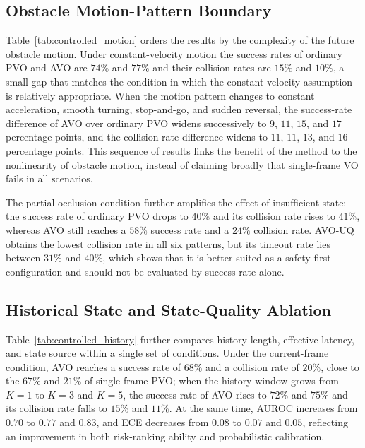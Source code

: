 \documentclass[10pt,a4paper,twocolumn]{article}
\begin{document}
\subsection{Obstacle Motion-Pattern Boundary}

Table~\ref{tab:controlled_motion} orders the results by the complexity of the future obstacle motion. Under constant-velocity motion the success rates of ordinary PVO and AVO are $74\%$ and $77\%$ and their collision rates are $15\%$ and $10\%$, a small gap that matches the condition in which the constant-velocity assumption is relatively appropriate. When the motion pattern changes to constant acceleration, smooth turning, stop-and-go, and sudden reversal, the success-rate difference of AVO over ordinary PVO widens successively to $9$, $11$, $15$, and $17$ percentage points, and the collision-rate difference widens to $11$, $11$, $13$, and $16$ percentage points. This sequence of results links the benefit of the method to the nonlinearity of obstacle motion, instead of claiming broadly that single-frame VO fails in all scenarios.

The partial-occlusion condition further amplifies the effect of insufficient state: the success rate of ordinary PVO drops to $40\%$ and its collision rate rises to $41\%$, whereas AVO still reaches a $58\%$ success rate and a $24\%$ collision rate. AVO-UQ obtains the lowest collision rate in all six patterns, but its timeout rate lies between $31\%$ and $40\%$, which shows that it is better suited as a safety-first configuration and should not be evaluated by success rate alone.

\subsection{Historical State and State-Quality Ablation}

Table~\ref{tab:controlled_history} further compares history length, effective latency, and state source within a single set of conditions. Under the current-frame condition, AVO reaches a success rate of $68\%$ and a collision rate of $20\%$, close to the $67\%$ and $21\%$ of single-frame PVO; when the history window grows from $K=1$ to $K=3$ and $K=5$, the success rate of AVO rises to $72\%$ and $75\%$ and its collision rate falls to $15\%$ and $11\%$. At the same time, AUROC increases from $0.70$ to $0.77$ and $0.83$, and ECE decreases from $0.08$ to $0.07$ and $0.05$, reflecting an improvement in both risk-ranking ability and probabilistic calibration.
\end{document}
